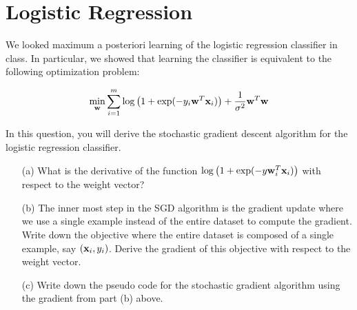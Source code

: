 \section{Logistic Regression}
\label{sec:lr}

We looked  maximum a posteriori learning of the logistic regression
classifier in class. In particular, we showed that learning the
classifier is equivalent to the following optimization problem:

$$\min_{\bf w} \sum_{i=1}^m \log\left(1 + \exp(-y_i {\bf w}^T{\bf x}_i)\right) + \frac{1}{\sigma^2} {\bf w}^T{\bf w}$$

In this question, you will derive the stochastic gradient descent
algorithm for the logistic regression classifier.

\begin{enumerate}
\item[(a)] What is the derivative of the function $\log\left(1 +
    \exp(-y {\bf w}_i^T{\bf x}_i)\right)$ with respect to the weight vector?

\item[(b)] The inner most step in the SGD algorithm is the gradient
  update where we use a single example instead of the entire dataset
  to compute the gradient. Write down the objective where the entire
  dataset is composed of a single example, say $({\bf x}_i, y_i)$. Derive
  the gradient of this objective with respect to the weight vector.

\item[(c)] Write down the pseudo code for the stochastic gradient
  algorithm using the gradient from part (b) above.
\end{enumerate}

